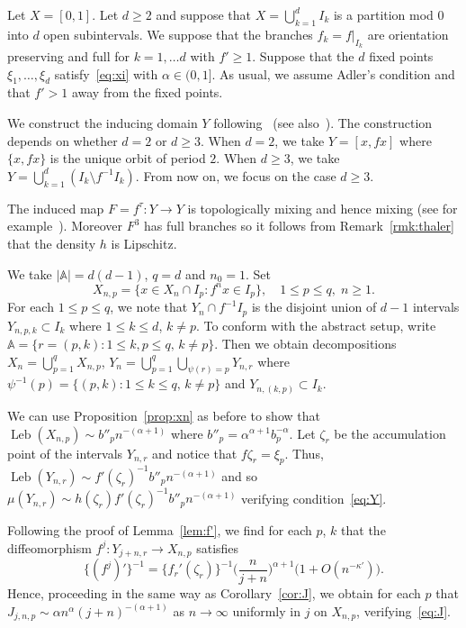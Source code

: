 \documentclass[12pt]{article}
\numberwithin{equation}{section}
\newcommand{\bbA}{{\mathbb A}}
\newcommand{\Leb}{\operatorname{Leb}}
\begin{document}
\begin{example}\label{ex:thaler}
Let $X=[0,1]$. Let $d\ge 2$ and  suppose that
$X=\bigcup_{k=1}^d I_k$ is a partition mod $0$ into $d$ open subintervals.
We suppose that the branches $f_k=f|_{I_k}$ are orientation preserving
and full for $k=1,\dots d$ with $f'\ge1$.
Suppose that the $d$ fixed points $\xi_1,\dots,\xi_d$ satisfy~\eqref{eq:xi} with $\alpha\in(0,1]$.
As usual, we assume Adler's condition and that $f'>1$ away from the fixed points.



We construct the inducing domain $Y$ following~\cite[Section~7]{Sera20} (see also~\cite[Section~4.1]{CMTsub}).
  The construction depends on whether $d = 2$ or $d \ge 3$. 
When $d = 2$, we take $Y = [ x, f x ]$ where $\{x, fx \}$ is the unique orbit of period $2$. When $d \ge 3$, we take $Y = \bigcup_{ k = 1 }^d (I_k \setminus  f^{ -1 } I_k )$. 
From now on, we focus on the case $d\ge3$.

The induced map $F=f^\tau:Y\to Y$ is topologically mixing and hence mixing (see for example~\cite[Proposition 4.2]{CMTsub}).
Moreover $F^3$ has full branches so it follows from Remark~\ref{rmk:thaler} that the density $h$ is Lipschitz.

We take $|\bbA|=d(d-1)$, $q=d$ and $n_0=1$.
Set 
\begin{equation} \label{eq:exX}
X_{n,p}=\{x\in X_n\cap I_p:f^nx\in I_p\},\quad 1\le p\le q,\;n\ge1.
\end{equation}
For each $1\le p\le q$, we note that
$Y_n\cap f^{-1}I_p$ is the disjoint union of $d-1$ intervals $Y_{n,p,k}\subset I_k$ where $1\le k\le d$, $k\neq p$.
To conform with the abstract setup, write
 $\bbA=\{r=(p,k):1\le k,p\le q,\,k\neq p\}$. 
Then we obtain decompositions 
$X_n=\bigcup_{p=1}^q X_{n,p}$, 
$Y_n=\bigcup_{p=1}^q \bigcup_{\psi(r)=p} Y_{n,r}$ where
$\psi^{-1}(p)=\{(p,k):1\le k\le q,\,k\neq p\}$ and $Y_{n,(k,p)}\subset I_k$.
  
  We can use Proposition~\ref{prop:xn} as before to show that
  $\Leb(X_{ n,p }) \sim b''_p n^{ - ( \alpha + 1 ) }$ where $b''_p = \alpha^{ \alpha + 1 }b_p^{ -\alpha }$.
  Let $\zeta_r$ be the accumulation point of the intervals $Y_{ n,r }$ and notice that $f \zeta_r =  \xi_p$. Thus, $\Leb(Y_{ n, r }) \sim f'(\zeta_r)^{ -1 } b''_p n^{ -(\alpha + 1) }$ and so
  $\mu (Y_{ n,r }) \sim h ( \zeta_r )  f'( \zeta_r )^{ -1 } b''_p n^{ - (\alpha + 1 ) } $ verifying condition~\eqref{eq:Y}.

  Following the proof of Lemma~\ref{lem:f'}, we find for each $p$, $k$ that the diffeomorphism $f^j : Y_{ j + n , r } \to X_{n,p}$ satisfies
	\[
		\{(f^j)'\}^{-1} =  \{f_r'(\zeta_r)\}^{-1} \Big(\frac{n}{j+n}\Big)^{\alpha+1}
		\big( 1 + O(n^{-\kappa'})\big)
		.
	\]
  Hence, proceeding in the same way as Corollary~\ref{cor:J}, we obtain for each $p$ that
  $J_{ j,n,p } \sim \alpha n^{ \alpha } ( j + n )^{ - ( \alpha + 1 )}$
as  $n\to\infty$ uniformly in $j$ on $X_{n,p}$,
  verifying~\eqref{eq:J}.
\end{example}
\end{document}
